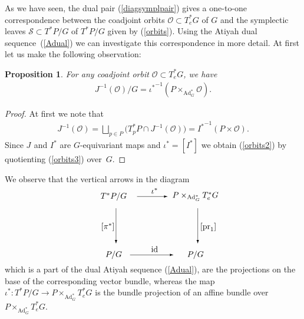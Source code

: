\documentclass[pdftex]{sigma}
\renewcommand{\O}{\mathcal{O}}
\renewcommand{\S}{\mathcal{S}}
\renewcommand{\to}{\rightarrow}
\DeclareMathOperator{\Ad}{Ad}
\newcommand{\id}{\text{\upshape id}}
\numberwithin{equation}{section}
\newtheorem{Proposition}[Theorem]{Proposition}
 { \theoremstyle{definition}
\newtheorem{Definition}[Theorem]{Definition}
\newtheorem{Example}[Theorem]{Example}
\newtheorem{Remark}[Theorem]{Remark} }
\begin{document}
As we have seen, the dual pair (\ref{diagsymplpair}) gives a one-to-one correspondence between the coadjoint orbits $\O\subset T_e^*G$ of $G$ and the symplectic leaves $\S\subset T^*P/G$ of $T^*P/G$ given by (\ref{orbits}). Using the Atiyah dual sequence~(\ref{Adual}) we can investigate this correspondence in more detail. At f\/irst let us make the following observation:

 \begin{Proposition}\label{prop:orbits} For any coadjoint orbit $\O\subset T^*_eG$, we have
 \begin{gather}\label{orbits2} J_{}^{-1}(\O)/G={\iota_{}^*}^{-1}(P\times_{\Ad_G^*}\O).\end{gather}
 \end{Proposition}
\begin{proof} At f\/irst we note that
 \begin{gather}\label{orbits3} J_{}^{-1}(\O)=
\bigsqcup_{p\in P}\big(T_p^*P\cap J_{}^{-1}(\O)\big)={I_{}^*}^{-1}(P\times \O).\end{gather}
 Since $J_{}$ and $I_{}^*$ are $G$-equivariant maps and $\iota_{}^*=[I_{}^*]$ we
obtain (\ref{orbits2}) by quotienting (\ref{orbits3}) over~$G$.
\end{proof}

We observe that the vertical arrows in the diagram
\begin{gather}\label{part1} \begin{split}& \unitlength=5mm \begin{picture}(11,5.6)(-1.5,0)
 \put(1,5){\makebox(0,0){$T^*P/G$}}
 \put(8,5){\makebox(0,0){$P\times_{\Ad_G^*} T^*_eG$}}
 \put(1,0){\makebox(0,0){$P/G$}}
 \put(8,0){\makebox(0,0){$P/G$}}
 \put(1.2,4){\vector(0,-1){3}}
 \put(8.2,4){\vector(0,-1){3}}
 \put(3,5){\vector(1,0){2.6}}
 \put(2.4,0){\vector(1,0){3.7}}
 \put(0.5,2.4){\makebox(0,0){$[\pi^*]$}}
 \put(9.1,2.4){\makebox(0,0){$[\operatorname{pr}_1]$}}
 \put(4.5,5.5){\makebox(0,0){$\iota^*$}}
 \put(4.5,0.5){\makebox(0,0){$\id$}}
 \end{picture}\end{split}
\end{gather}
which is a part of the dual Atiyah sequence (\ref{Adual}), are the projections on the base of the corresponding vector bundle, whereas the map $\iota^*\colon T^*P/G\to P\times_{\Ad_G^*} T^*_eG$ is the bundle projection of an af\/f\/ine bundle over $P\times_{\Ad_G^*} T^*_eG$.
\end{document}
